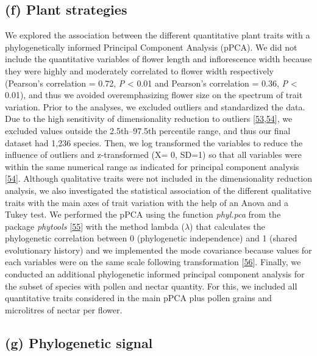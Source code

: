 \documentclass[
  12pt,
  a4paper,
]{article}
\begin{document}
\hypertarget{f-plant-strategies}{%
\subsection{(f) Plant strategies}\label{f-plant-strategies}}

We explored the association between the different quantitative plant traits with a phylogenetically informed Principal Component Analysis (pPCA). We did not include the quantitative variables of flower length and inflorescence width because they were highly and moderately correlated to flower width respectively (Pearson's correlation = 0.72, \emph{P} \textless{} 0.01 and Pearson's correlation = 0.36, \emph{P} \textless{} 0.01), and thus we avoided overemphasizing flower size on the spectrum of trait variation. Prior to the analyses, we excluded outliers and standardized the data. Due to the high sensitivity of dimensionality reduction to outliers {[}\protect\hyperlink{ref-serneels2008}{53},\protect\hyperlink{ref-legendre2012}{54}{]}, we excluded values outside the 2.5th--97.5th percentile range, and thus our final dataset had 1,236 species. Then, we log transformed the variables to reduce the influence of outliers and z-transformed (X= 0, SD=1) so that all variables were within the same numerical range as indicated for principal component analysis {[}\protect\hyperlink{ref-legendre2012}{54}{]}. Although qualitative traits were not included in the dimensionality reduction analysis, we also investigated the statistical association of the different qualitative traits with the main axes of trait variation with the help of an Anova and a Tukey test. We performed the pPCA using the function \emph{phyl.pca} from the package \emph{phytools} {[}\protect\hyperlink{ref-revell2012}{55}{]} with the method lambda (\(\lambda\)) that calculates the phylogenetic correlation between 0 (phylogenetic independence) and 1 (shared evolutionary history) and we implemented the mode covariance because values for each variables were on the same scale following transformation {[}\protect\hyperlink{ref-abdi2010}{56}{]}. Finally, we conducted an additional phylogenetic informed principal component analysis for the subset of species with pollen and nectar quantity. For this, we included all quantitative traits considered in the main pPCA plus pollen grains and microlitres of nectar per flower.

\hypertarget{g-phylogenetic-signal}{%
\subsection{(g) Phylogenetic signal}\label{g-phylogenetic-signal}}
\end{document}
